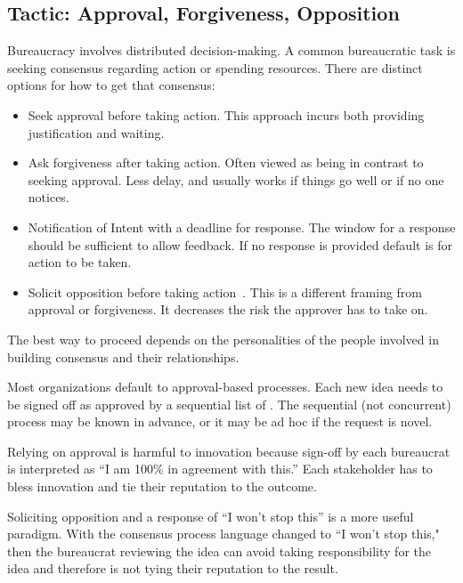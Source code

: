 \subsection*{Tactic: Approval, Forgiveness, Opposition\label{sec:approval-forgiveness-opposition}}

Bureaucracy involves distributed decision-making. 
A common bureaucratic task is seeking consensus regarding action or spending resources. There are distinct options for how to get that consensus:
\begin{itemize}
    \item Seek approval before taking action. This approach incurs both providing justification and waiting.
    \item Ask forgiveness after taking action. Often viewed as being in contrast to seeking approval. Less delay, and usually works if things go well or if no one notices. 
    \item Notification of Intent with a deadline for response. The window for a response should be sufficient to  allow feedback. If no response is provided default is for action to be taken.
    \item Solicit opposition before taking action~\cite{2009_Perr}. This is a different framing from approval or forgiveness. It decreases the risk the approver has to take on.
\end{itemize}
The best way to proceed depends on the personalities of the people involved in building consensus and their relationships. 

Most organizations default to approval-based  processes. Each new idea needs to be signed off as approved by a sequential list of 
\iftoggle{glossarysubstitutionworks}{\glspl{bureaucrat}}{bureaucrats}. The sequential (not concurrent) process may be known in advance, or it may be ad hoc if the request is novel.

Relying on approval is harmful to innovation because sign-off by each bureaucrat is interpreted as ``I am 100\% in agreement with this.'' Each stakeholder has to bless innovation and tie their reputation to the outcome.

Soliciting opposition and a response of ``I won't stop this'' is a more useful paradigm. With the consensus process language changed to ``I won't stop this," then the bureaucrat reviewing the idea can avoid taking responsibility for the idea and therefore is not tying their reputation to the result.



